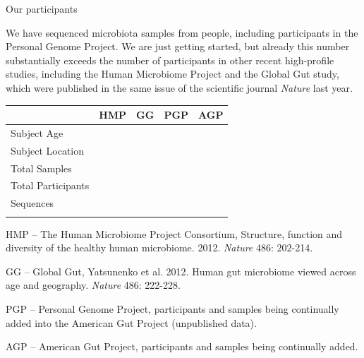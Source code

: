 \documentclass[10pt,letterpaper]{article}
\newenvironment{my_itemize}{
\begin{itemize}
  \setlength{\itemsep}{1pt}
  \setlength{\parskip}{0pt}
  \setlength{\parsep}{0pt}}{\end{itemize}
}
\begin{document}
\colorbox{agpMustard}{\parbox{\textwidth}{\vspace{1mm} \LARGE \centering Our participants \vspace{1mm}}}

We have sequenced \numSamples{} microbiota samples from \numParticipants{} people, including \pgpParticipants{} participants in the Personal Genome Project. We are just getting started, but already this number substantially exceeds the number of participants in other recent high-profile studies, including the Human Microbiome Project and the Global Gut study, which were published in the same issue of the scientific journal {\em Nature} last year.

\begin{framed}
\parbox{0.30\textwidth}{
}
\hspace{5mm}
\parbox{0.60\textwidth}{
{\footnotesize
\begin{tabular}{ l c c c c }													
\hline \addlinespace[1mm]													
 & HMP & GG	& PGP & AGP \\		
\hline \addlinespace[1mm]													
Subject Age & \hmpAge{} & \ggAge{} & \pgpAge{} & \agpAge{} \\
Subject Location & \hmpLocation{} & \ggLocation{} & \pgpLocation{} & \agpLocation{} \\
Total Samples & \hmpSamples{} & \ggSamples{} & \pgpSamples{} & \agpSamples{} \\
Total Participants & \hmpParticipants{} & \ggParticipants{} & \pgpParticipants{} & \agpParticipants{} \\
Sequences & \hmpSequences{} & \ggSequences{} & \pgpSequences{} & \agpSequences{} \\ \addlinespace[.5mm]
\hline															
\end{tabular}															
}
}
\vspace{-8mm}
{\fontsize{7pt}{7pt}\selectfont
\begin{my_itemize}
\item[] HMP -- The Human Microbiome Project Consortium, Structure, function and diversity of the healthy human microbiome. 2012. {\em Nature} 486: 202-214.
\item[] GG -- Global Gut, Yatsunenko et al. 2012. Human gut microbiome viewed across age and geography. {\em Nature} 486: 222-228.
\item[] PGP -- Personal Genome Project, participants and samples being continually added into the American Gut Project (unpublished data).
\item[] AGP -- American Gut Project, participants and samples being continually added.
\end{my_itemize}
\vspace{-3mm}
}
\label{tab1} 
\end{framed}
\end{document}
